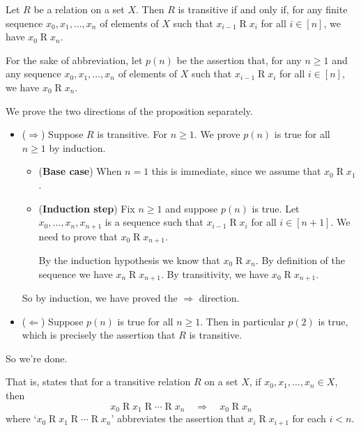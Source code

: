 \begin{proposition}
\label{propTransitiveChain}
Let $R$ be a relation on a set $X$. Then $R$ is transitive if and only if, for any finite sequence $x_0, x_1, \dots, x_n$ of elements of $X$ such that $x_{i-1} \mathrel{R} x_i$ for all $i \in [n]$, we have $x_0 \mathrel{R} x_n$.
\end{proposition}
\begin{cproof}
For the sake of abbreviation, let $p(n)$ be the assertion that, for any $n \ge 1$ and any sequence $x_0, x_1, \dots, x_n$ of elements of $X$ such that $x_{i-1} \mathrel{R} x_i$ for all $i \in [n]$, we have $x_0 \mathrel{R} x_n$.

We prove the two directions of the proposition separately.
\begin{itemize}
\item ($\Rightarrow$) Suppose $R$ is transitive. For $n \ge 1$. We prove $p(n)$ is true for all $n \ge 1$ by induction.
\begin{itemize}
\item (\textbf{Base case}) When $n=1$ this is immediate, since we assume that $x_0 \mathrel{R} x_1$.
\item (\textbf{Induction step}) Fix $n \ge 1$ and suppose $p(n)$ is true. Let $x_0, \dots, x_n, x_{n+1}$ is a sequence such that $x_{i-1} \mathrel{R} x_i$ for all $i \in [n+1]$. We need to prove that $x_0 \mathrel{R} x_{n+1}$.

By the induction hypothesis we know that $x_0 \mathrel{R} x_n$. By definition of the sequence we have $x_n \mathrel{R} x_{n+1}$. By transitivity, we have $x_0 \mathrel{R} x_{n+1}$.
\end{itemize}
So by induction, we have proved the $\Rightarrow$ direction.
\item ($\Leftarrow$)
Suppose $p(n)$ is true for all $n \ge 1$. Then in particular $p(2)$ is true, which is precisely the assertion that $R$ is transitive.
\end{itemize}
So we're done.
\end{cproof}

That is,  states that for a transitive relation $R$ on a set $X$, if $x_0, x_1, \dots, x_n \in X$, then
\[ x_0 \mathrel{R} x_1 \mathrel{R} \cdots \mathrel{R} x_n \quad \Rightarrow \quad x_0 \mathrel{R} x_n \]
where `$x_0 \mathrel{R} x_1 \mathrel{R} \cdots  \mathrel{R} x_n$' abbreviates the assertion that $x_i \mathrel{R} x_{i+1}$ for each $i < n$.

